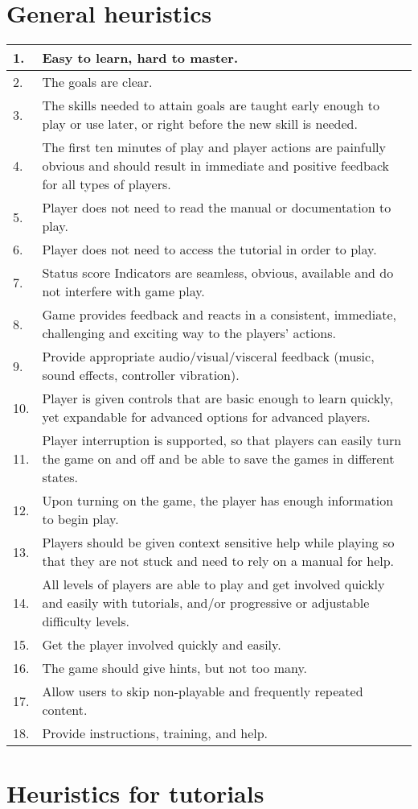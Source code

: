 \appendix
\chapter{General heuristics}

\begin{center}
\begin{tabularx}{\textwidth}{|l|X|}
	\hline
	1. & Easy to learn, hard to master. \\ \hline
	2. & The goals are clear. \\ \hline	
	3. & The skills needed to attain goals are taught early enough to play or use later, or right before the new skill is needed. \\ \hline
	4. & The first ten minutes of play and player actions are painfully obvious and should result in immediate and positive feedback for all types of players. \\ \hline
	5. & Player does not need to read the manual or documentation to play. \\ \hline
	6. & Player does not need to access the tutorial in order to play. \\ \hline
	7. & Status score Indicators are seamless, obvious, available and do not interfere with game play. \\ \hline
	8. & Game provides feedback and reacts in a consistent, immediate, challenging and exciting way to the players’ actions. \\ \hline
	9. & Provide appropriate audio/visual/visceral feedback (music, sound effects, controller vibration). \\ \hline
	10. & Player is given controls that are basic enough to learn quickly, yet expandable for advanced options for advanced players. \\ \hline
	11. & Player interruption is supported, so that players can easily turn the game on and off and be able to save the games in different states. \\ \hline
	12. & Upon turning on the game, the player has enough information to begin play. \\ \hline
	13. & Players should be given context sensitive help while playing so that they are not stuck and need to rely on a manual for help. \\ \hline
	14. & All levels of players are able to play and get involved quickly and easily with tutorials, and/or progressive or adjustable difficulty levels. \\ \hline
	15. & Get the player involved quickly and easily. \\ \hline
	16. & The game should give hints, but not too many. \\ \hline
	17. & Allow users to skip non-playable and frequently repeated content. \\ \hline
	18. & Provide instructions, training, and help. \\ \hline
\end{tabularx}
\end{center}

\chapter{Heuristics for tutorials}
